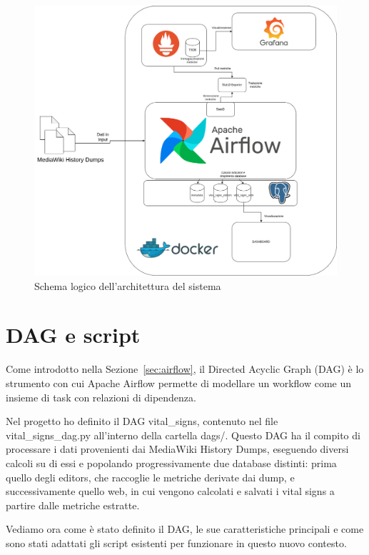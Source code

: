 \begin{figure}[h]
    \centering
    \includegraphics[width=\textwidth]{img/vital-signs-pipeline.drawio.png}
    \caption{Schema logico dell'architettura del sistema}
    \label{fig:architettura_sistema}
\end{figure}

\section{DAG e script}
\label{sec:dag_script}

Come introdotto nella Sezione~\ref{sec:airflow}, il Directed Acyclic Graph (DAG) è lo strumento con cui Apache Airflow permette di modellare un workflow come un insieme di task con relazioni di dipendenza.

Nel progetto ho definito il DAG vital\_signs, contenuto nel file vital\_signs\_dag.py all’interno della cartella dags/. Questo DAG ha il compito di processare i dati provenienti dai MediaWiki History Dumps, eseguendo diversi calcoli su di essi e popolando progressivamente due database distinti: prima quello degli editors, che raccoglie le metriche derivate dai dump, e successivamente quello web, in cui vengono calcolati e salvati i vital signs a partire dalle metriche estratte.

Vediamo ora come è stato definito il DAG, le sue caratteristiche principali e come sono stati adattati gli script esistenti per funzionare in questo nuovo contesto.

